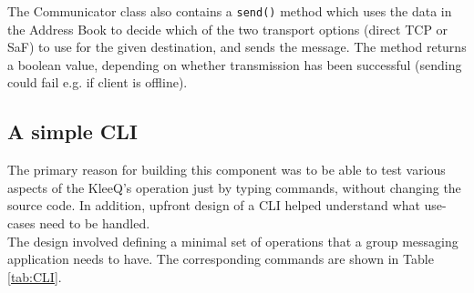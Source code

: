 \documentclass[a4paper, 12pt]{report}
\begin{document}
The Communicator class also contains a \texttt{send()} method which uses the data in the Address Book to decide which of the two transport options (direct TCP or SaF) to use for the given destination, and sends the message. The method returns a boolean value, depending on whether transmission has been successful (sending could fail e.g. if client is offline).


\subsection{A simple CLI}
The primary reason for building this component was to be able to test various aspects of the KleeQ's operation just by typing commands, without changing the source code. In addition, upfront design of a CLI helped understand what use-cases need to be handled. \\

The design involved defining a minimal set of operations that a group messaging application needs to have. The corresponding commands are shown in Table \ref{tab:CLI}.
\end{document}
